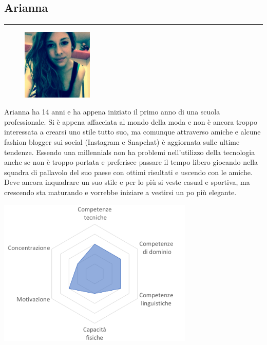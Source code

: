 \documentclass[12pt,a4paper]{report}
\begin{document}
\subsection*{Arianna}
\rule{\textwidth}{0.5pt}
\begin{figure}
  \centering
  \includegraphics[width=0.3\textwidth]{"Images Latex/Personas/Arianna"}
\end{figure}
Arianna ha 14 anni e ha appena iniziato il primo anno di una scuola professionale. Si è appena affacciata al mondo della moda e non è ancora troppo interessata a crearsi uno stile tutto suo, ma comunque attraverso amiche e alcune fashion blogger sui social (Instagram e Snapchat) è aggiornata sulle ultime tendenze. Essendo una millennials non ha problemi nell'utilizzo della tecnologia anche se non è troppo portata e preferisce passare il tempo libero giocando nella squadra di pallavolo del suo paese con ottimi risultati e uscendo con le amiche. Deve ancora inquadrare un suo stile e per lo più si veste casual e sportiva, ma crescendo sta maturando e vorrebbe iniziare a vestirsi un po più elegante.
\begin{center}
  \includegraphics[width=0.7\textwidth]{"Images Latex/Personas/Arianna14"}
\end{center}
\newpage
\end{document}
